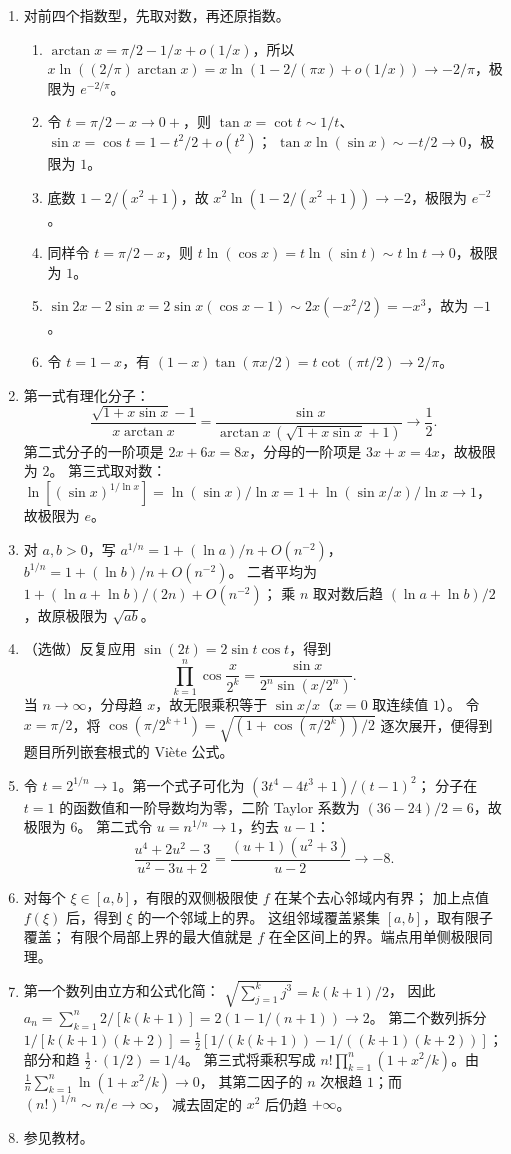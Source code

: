 \begin{enumerate}
\item 对前四个指数型，先取对数，再还原指数。
\begin{enumerate}
\item $\arctan x=\pi/2-1/x+o(1/x)$，所以
$x\ln((2/\pi)\arctan x)
=x\ln(1-2/(\pi x)+o(1/x))\to-2/\pi$，极限为 $e^{-2/\pi}$。
\item 令 $t=\pi/2-x\to0+$，则
$\tan x=\cot t\sim1/t$、$\sin x=\cos t=1-t^2/2+o(t^2)$；
$\tan x\ln(\sin x)\sim-t/2\to0$，极限为 $1$。
\item 底数 $1-2/(x^2+1)$，故
$x^2\ln(1-2/(x^2+1))\to-2$，极限为 $e^{-2}$。
\item 同样令 $t=\pi/2-x$，则
$t\ln(\cos x)=t\ln(\sin t)\sim t\ln t\to0$，极限为 $1$。
\item $\sin2x-2\sin x=2\sin x(\cos x-1)\sim2x(-x^2/2)=-x^3$，故为 $-1$。
\item 令 $t=1-x$，有
$(1-x)\tan(\pi x/2)=t\cot(\pi t/2)\to2/\pi$。
\end{enumerate}
\item 第一式有理化分子：
\[
\frac{\sqrt{1+x\sin x}-1}{x\arctan x}
=\frac{\sin x}{\arctan x\,(\sqrt{1+x\sin x}+1)}
\longrightarrow\frac12.
\]
第二式分子的一阶项是 $2x+6x=8x$，分母的一阶项是 $3x+x=4x$，故极限为 $2$。
第三式取对数：$\ln[(\sin x)^{1/\ln x}]
=\ln(\sin x)/\ln x
=1+\ln(\sin x/x)/\ln x\to1$，故极限为 $e$。
\item 对 $a,b>0$，写
$a^{1/n}=1+(\ln a)/n+O(n^{-2})$，$b^{1/n}=1+(\ln b)/n+O(n^{-2})$。
二者平均为 $1+(\ln a+\ln b)/(2n)+O(n^{-2})$；
乘 $n$ 取对数后趋 $(\ln a+\ln b)/2$，故原极限为 $\sqrt{ab}$。
\item（选做）反复应用 $\sin(2t)=2\sin t\cos t$，得到
\[
\prod_{k=1}^n\cos\frac{x}{2^k}
=\frac{\sin x}{2^n\sin(x/2^n)}.
\]
当 $n\to\infty$，分母趋 $x$，故无限乘积等于 $\sin x/x$（$x=0$ 取连续值 $1$）。
令 $x=\pi/2$，将
$\cos(\pi/2^{k+1})=\sqrt{(1+\cos(\pi/2^k))/2}$
逐次展开，便得到题目所列嵌套根式的 Vi\`ete 公式。
\item 令 $t=2^{1/n}\to1$。第一个式子可化为
$(3t^4-4t^3+1)/(t-1)^2$；
分子在 $t=1$ 的函数值和一阶导数均为零，二阶 Taylor 系数为
$(36-24)/2=6$，故极限为 $6$。
第二式令 $u=n^{1/n}\to1$，约去 $u-1$：
\[
\frac{u^4+2u^2-3}{u^2-3u+2}
=\frac{(u+1)(u^2+3)}{u-2}\longrightarrow-8.
\]
\item 对每个 $\xi\in[a,b]$，有限的双侧极限使 $f$ 在某个去心邻域内有界；
加上点值 $f(\xi)$ 后，得到 $\xi$ 的一个邻域上的界。
这组邻域覆盖紧集 $[a,b]$，取有限子覆盖；
有限个局部上界的最大值就是 $f$ 在全区间上的界。端点用单侧极限同理。
\item 第一个数列由立方和公式化简：
$\sqrt{\sum_{j=1}^k j^3}=k(k+1)/2$，
因此 $a_n=\sum_{k=1}^n2/[k(k+1)]=2(1-1/(n+1))\to2$。
第二个数列拆分
$1/[k(k+1)(k+2)]
=\tfrac12[1/(k(k+1))-1/((k+1)(k+2))]$；
部分和趋 $\tfrac12\cdot(1/2)=1/4$。
第三式将乘积写成
$n!\prod_{k=1}^n(1+x^2/k)$。由
$\frac1n\sum_{k=1}^n\ln(1+x^2/k)\to0$，
其第二因子的 $n$ 次根趋 $1$；而 $(n!)^{1/n}\sim n/e\to\infty$，
减去固定的 $x^2$ 后仍趋 $+\infty$。
\item 参见教材。
\end{enumerate}
